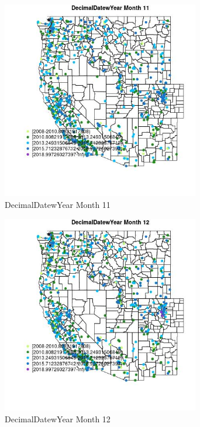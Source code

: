 \begin{figure} 
\centering  
\includegraphics[width=0.77\textwidth]{Code_Outputs/Report_ML_input_PM25_Step4_part_e_de_duplicated_aveswNAs_MapObsMo11DecimalDatewYear.jpg} 
\caption{\label{fig:Report_ML_input_PM25_Step4_part_e_de_duplicated_aveswNAsMapObsMo11DecimalDatewYear}DecimalDatewYear Month 11} 
\end{figure} 
 

\clearpage 

\begin{figure} 
\centering  
\includegraphics[width=0.77\textwidth]{Code_Outputs/Report_ML_input_PM25_Step4_part_e_de_duplicated_aveswNAs_MapObsMo12DecimalDatewYear.jpg} 
\caption{\label{fig:Report_ML_input_PM25_Step4_part_e_de_duplicated_aveswNAsMapObsMo12DecimalDatewYear}DecimalDatewYear Month 12} 
\end{figure} 
 

